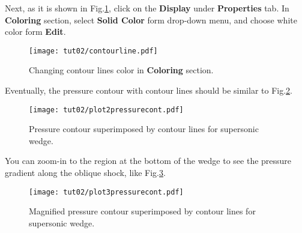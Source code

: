 Next, as it is shown in Fig.\ref{fig:colorby2}, click on the \textbf{Display} under \textbf{Properties} tab. In \textbf{Coloring} section, select \textbf{Solid Color} form drop-down menu, and choose white color form \textbf{Edit}.
\begin{figure}[htbp]
    \centering
    \texttt{[image: tut02/contourline.pdf]}
    \caption{Changing contour lines color in \textbf{Coloring} section.}
    \label{fig:colorby2}
\end{figure}
Eventually, the pressure contour with contour lines should be similar to Fig.\ref{fig:pressure_contour_lines}.
\begin{figure}[htbp]
    \centering
    \texttt{[image: tut02/plot2pressurecont.pdf]}
    \caption{Pressure contour superimposed by contour lines for supersonic wedge.}
    \label{fig:pressure_contour_lines}
\end{figure}
You can zoom-in to the region at the bottom of the wedge to see the pressure gradient along the oblique
shock, like Fig.\ref{fig:pressure_contour_lines_zoom}.
\begin{figure}[htbp]
    \centering
    \texttt{[image: tut02/plot3pressurecont.pdf]}
    \caption{Magnified pressure contour superimposed by contour lines for supersonic wedge.}
    \label{fig:pressure_contour_lines_zoom}
\end{figure}

